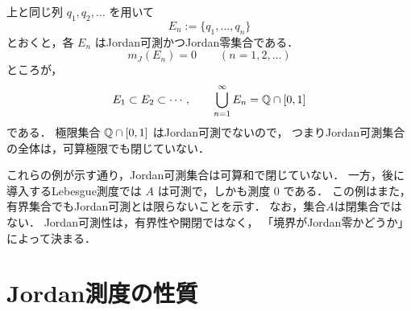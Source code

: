 \begin{example}[極限に関して閉じていない]
上と同じ列 $q_1,q_2,\dots$ を用いて
    \[
    E_n:=\{q_1,\dots,q_n\}
    \]
    とおくと，各 $E_n$ はJordan可測かつJordan零集合である．
    \[
    m_J(E_n)=0 \qquad (n=1,2,\dots)
    \]
    ところが，
    \[
    E_1 \subset E_2 \subset \cdots,
    \qquad
    \bigcup_{n=1}^\infty E_n=\mathbb Q \cap [0,1]
    \]
    である．
    極限集合 $\mathbb Q \cap [0,1]$ はJordan可測でないので，
    つまりJordan可測集合の全体は，可算極限でも閉じていない．
\end{example}

\begin{remark}
これらの例が示す通り，Jordan可測集合は可算和で閉じていない．
一方，後に導入するLebesgue測度では
$A$ は可測で，しかも測度 $0$ である．
この例はまた，有界集合でもJordan可測とは限らないことを示す．
なお，集合$A$は閉集合ではない．
Jordan可測性は，有界性や開閉ではなく，
「境界がJordan零かどうか」によって決まる．
\end{remark}



\section{Jordan測度の性質}

